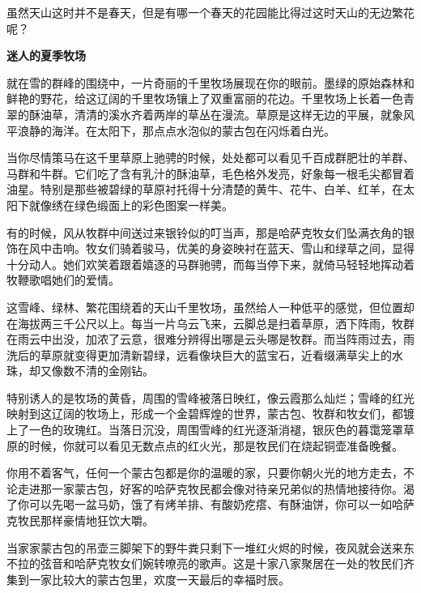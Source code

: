 \documentclass[12pt,UTF-8,openany]{ctexbook}
\begin{document}
\begin{normalsize}
    虽然天山这时并不是春天，但是有哪一个春天的花园能比得过这时天山的无边繁花呢？
    
    \begin{center}
    
    \begin{large}\textbf{迷人的夏季牧场}\end{large}
    
    \end{center}
    
    就在雪的群峰的围绕中，一片奇丽的千里牧场展现在你的眼前。墨绿的原始森林和鲜艳的野花，给这辽阔的千里牧场镶上了双重富丽的花边。千里牧场上长着一色青翠的酥油草，清清的溪水齐着两岸的草丛在漫流。草原是这样无边的平展，就象风平浪静的海洋。在太阳下，那点点水泡似的蒙古包在闪烁着白光。
    
    当你尽情策马在这千里草原上驰骋的时候，处处都可以看见千百成群肥壮的羊群、马群和牛群。它们吃了含有乳汁的酥油草，毛色格外发亮，好象每一根毛尖都冒着油星。特别是那些被碧绿的草原衬托得十分清楚的黄牛、花牛、白羊、红羊，在太阳下就像绣在绿色缎面上的彩色图案一样美。
    
    有的时候，风从牧群中间送过来银铃似的叮当声，那是哈萨克牧女们坠满衣角的银饰在风中击响。牧女们骑着骏马，优美的身姿映衬在蓝天、雪山和绿草之间，显得十分动人。她们欢笑着跟着嬉逐的马群驰骋，而每当停下来，就倚马轻轻地挥动着牧鞭歌唱她们的爱情。
    
    这雪峰、绿林、繁花围绕着的天山千里牧场，虽然给人一种低平的感觉，但位置却在海拔两三千公尺以上。每当一片乌云飞来，云脚总是扫着草原，洒下阵雨，牧群在雨云中出没，加浓了云意，很难分辨得出哪是云头哪是牧群。而当阵雨过去，雨洗后的草原就变得更加清新碧绿，远看像块巨大的蓝宝石，近看缀满草尖上的水珠，却又像数不清的金刚钻。
    
    特别诱人的是牧场的黄昏，周围的雪峰被落日映红，像云霞那么灿烂；雪峰的红光映射到这辽阔的牧场上，形成一个金碧辉煌的世界，蒙古包、牧群和牧女们，都镀上了一色的玫瑰红。当落日沉没，周围雪峰的红光逐渐消褪，银灰色的暮霭笼罩草原的时候，你就可以看见无数点点的红火光，那是牧民们在烧起铜壶准备晚餐。
    
    你用不着客气，任何一个蒙古包都是你的温暖的家，只要你朝火光的地方走去，不论走进那一家蒙古包，好客的哈萨克牧民都会像对待亲兄弟似的热情地接待你。渴了你可以先喝一盆马奶，饿了有烤羊排、有酸奶疙瘩、有酥油饼，你可以一如哈萨克牧民那样豪情地狂饮大嚼。
    
    当家家蒙古包的吊壶三脚架下的野牛粪只剩下一堆红火烬的时候，夜风就会送来东不拉的弦音和哈萨克牧女们婉转嘹亮的歌声。这是十家八家聚居在一处的牧民们齐集到一家比较大的蒙古包里，欢度一天最后的幸福时辰。
    

\end{normalsize}
\end{document}
